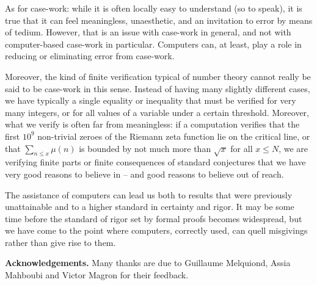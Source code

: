 As for case-work: while it is often locally easy to understand (so to
speak), it is true that it
can feel meaningless, unaesthetic, and an invitation to error by
means of tedium. However, that is an issue with case-work in general, and not
with computer-based case-work in particular. Computers can, at least, play
a role in reducing or eliminating error from case-work.

Moreover, the kind of finite verification typical of number theory
cannot really be said to be case-work in this sense. Instead of having many
slightly different cases, we have typically a single equality or inequality
that must be verified for very many integers, or for all values of a variable
under a certain threshold. Moreover, what we verify is often far from meaningless: if a computation verifies that the first $10^9$ non-trivial zeroes of the
Riemann zeta function lie on the critical line, or that $\sum_{n\leq x}
\mu(n)$ is bounded by not much more than $\sqrt{x}$ for all $x\leq N$,
we are verifying finite parts or finite consequences of standard conjectures
that we have very good reasons to believe in -- and good reasons
to believe out of reach.

The assistance of computers can lead us both to results that were previously
unattainable and to a higher standard in certainty and rigor.
It may be some time before the standard of rigor set by formal proofs
becomes widespread, but we have come to the point where computers, correctly
used, can quell misgivings rather than give rise to them. 


{\bf Acknowledgements.} Many thanks are due to Guillaume Melquiond, Assia Mahboubi and Victor Magron for their feedback.
% 
% 
% 


